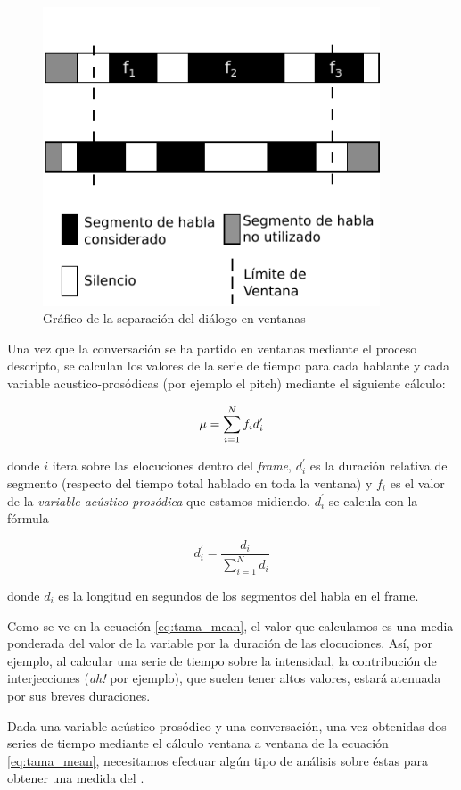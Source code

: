 \begin{figure}[h!]
\centering
\includegraphics[width=10cm]{images/tama_improved.pdf}
\caption{Gráfico de la separación del diálogo en ventanas}

\label{tama}
\end{figure}

Una vez que la conversación se ha partido en ventanas mediante el proceso descripto, se calculan los valores de la serie de tiempo para cada hablante y cada variable acustico-prosódicas (por ejemplo el pitch) mediante el siguiente cálculo:

\begin{equation}
    \mu = \sum\limits_{i=1}^N f_i d_i^\prime \label{eq:tama_mean}\\
\end{equation}

\noindent donde $i$ itera sobre las elocuciones dentro del \emph{frame}, $d_i^\prime$ es la duración relativa del segmento (respecto del tiempo total hablado en toda la ventana) y $f_i$ es el valor de la \emph{variable acústico-prosódica} que estamos midiendo. $d_i^\prime$ se calcula con la fórmula

\begin{equation}
d_i^\prime = \frac{d_i}{\sum\limits_{i=1}^N d_i}
\end{equation}

\noindent donde $d_i$ es la longitud en segundos de los segmentos del habla en el frame.

Como se ve en la ecuación \ref{eq:tama_mean}, el valor que calculamos es una media ponderada del valor de la variable por la duración de las elocuciones. Así, por ejemplo, al calcular una serie de tiempo sobre la intensidad, la contribución de interjecciones (\emph{ah!} por ejemplo), que suelen tener altos valores, estará atenuada por sus breves duraciones.

Dada una variable acústico-prosódico y una conversación, una vez obtenidas  dos series de tiempo mediante el cálculo ventana a ventana de la ecuación \ref{eq:tama_mean}, necesitamos efectuar algún tipo de análisis sobre éstas para obtener una medida del \entrainment.
